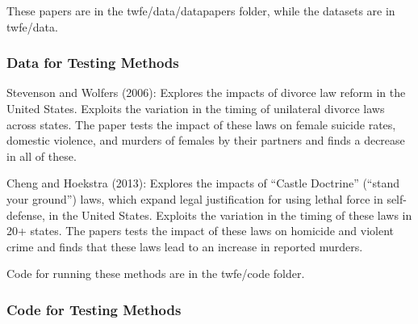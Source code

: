 \documentclass{beamer}
\newenvironment{wideitemize}{\itemize\addtolength{\itemsep}{8pt}}{\enditemize}
\begin{document}
\begin{frame}
These papers are in the {\color{red} twfe/data/datapapers} folder, while the datasets are in {\color{red} twfe/data}.
\frametitle{Data for Testing Methods}
\begin{wideitemize}
	\item {\color{yellow} Stevenson and Wolfers (2006):} Explores the impacts of divorce law reform in the United States. Exploits the variation in the timing of unilateral divorce laws across states. The paper tests the impact of these laws on female suicide rates, domestic violence, and murders of females by their partners and finds a decrease in all of these.
	\item {\color{yellow} Cheng and Hoekstra (2013):} Explores the impacts of ``Castle Doctrine'' (``stand your ground'') laws, which expand legal justification for using lethal force in self-defense, in the United States. Exploits the variation in the timing of these laws in 20+ states. The papers tests the impact of these laws on homicide and violent crime and finds that these laws lead to an increase in reported murders.
\end{wideitemize}
\end{frame}

\begin{frame}
Code for running these methods are in the {\color{red} twfe/code} folder.
\frametitle{Code for Testing Methods}
\end{frame}
\end{document}
